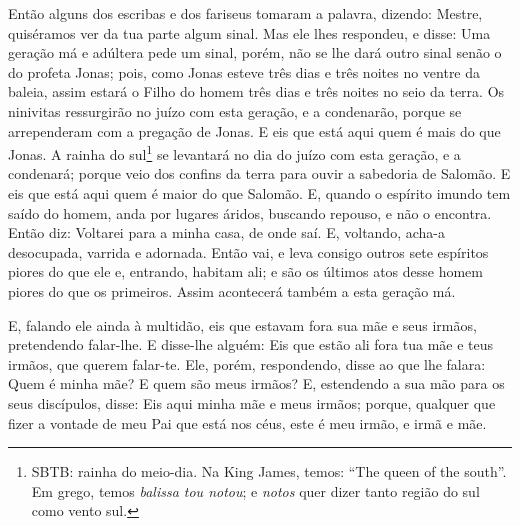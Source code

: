 Então alguns dos escribas e dos fariseus tomaram a palavra,
dizendo: Mestre, quiséramos ver da tua parte algum sinal. Mas
ele lhes respondeu, e disse: Uma geração má e adúltera pede um
sinal, porém, não se lhe dará outro sinal senão o do profeta Jonas;
pois, como Jonas esteve três dias e três noites no ventre da
baleia, assim estará o Filho do homem três dias e três noites no
seio da terra. Os ninivitas ressurgirão no juízo com esta
geração, e a condenarão, porque se arrependeram com a pregação de
Jonas. E eis que está aqui quem é mais do que Jonas. A rainha
do sul\footnote{SBTB: rainha do meio-dia. Na King James, temos:
``The queen of the south''. Em grego, temos \emph{balissa tou
notou}; e \emph{notos} quer dizer tanto região do sul como vento
sul.} se levantará no dia do juízo com esta geração, e a condenará;
porque veio dos confins da terra para ouvir a sabedoria de Salomão.
E eis que está aqui quem é maior do que Salomão. E, quando o
espírito imundo tem saído do homem, anda por lugares áridos,
buscando repouso, e não o encontra. Então diz: Voltarei para
a minha casa, de onde saí. E, voltando, acha-a desocupada, varrida e
adornada. Então vai, e leva consigo outros sete espíritos
piores do que ele e, entrando, habitam ali; e são os últimos atos
desse homem piores do que os primeiros. Assim acontecerá também a
esta geração má.

E, falando ele ainda à multidão, eis que estavam fora sua mãe e
seus irmãos, pretendendo falar-lhe. E disse-lhe alguém: Eis
que estão ali fora tua mãe e teus irmãos, que querem falar-te.
Ele, porém, respondendo, disse ao que lhe falara: Quem é
minha mãe? E quem são meus irmãos? E, estendendo a sua mão
para os seus discípulos, disse: Eis aqui minha mãe e meus irmãos;
porque, qualquer que fizer a vontade de meu Pai que está nos
céus, este é meu irmão, e irmã e mãe.

\medskip

